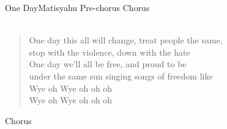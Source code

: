 \begin{song}{One Day}{Matisyahu}
		Pre-chorus \qquad Chorus \\ \\
		
		\begin{verse}
			One day this all will change, treat people the same, \\
			stop with the violence, down with the hate \\
			One day we'll all be free, and proud to be  \\
			under the same sun singing songs of freedom like \\
			
			Wye oh  Wye oh oh oh  \\
			Wye oh  Wye oh oh oh  \\
		\end{verse} 
		
		Chorus  \\
		
	\end{song}
